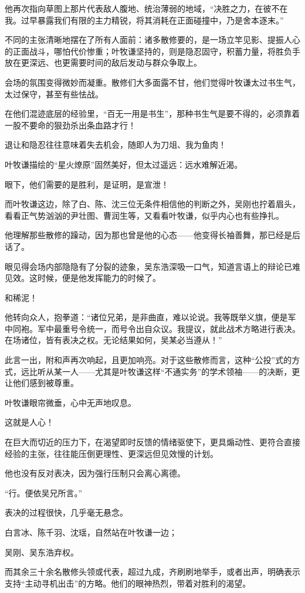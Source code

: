 他再次指向草图上那片代表敌人腹地、统治薄弱的地域，“决胜之力，在彼不在我。过早暴露我们有限的主力精锐，将其消耗在正面碰撞中，乃是舍本逐末。”

不同的主张清晰地摆在了所有人面前：诸多散修要的，是一场立竿见影、提振人心的正面战斗，哪怕代价惨重；叶牧谦坚持的，则是隐忍固守，积蓄力量，将胜负手放在更深远、也更需要时间的敌后发动与群众争取上。

会场的氛围变得微妙而凝重。散修们大多面露不甘，他们觉得叶牧谦太过书生气，太过保守，甚至有些怯战。

在他们混迹底层的经验里，“百无一用是书生”，那种书生气是要不得的，必须靠着一股不要命的狠劲杀出条血路才行！

退让和隐忍往往意味着失去机会，随即人为刀俎、我为鱼肉！

叶牧谦描绘的“星火燎原”固然美好，但太过遥远：远水难解近渴。

眼下，他们需要的是胜利，是证明，是宣泄！

而叶牧谦这边，除了白、陈、沈三位无条件相信他的判断之外，吴刚也拧着眉头，看看正气势汹汹的尹壮图、曹润生等，又看看叶牧谦，似乎内心也有些挣扎。

他理解那些散修的躁动，因为那也曾是他的心态——他变得长袖善舞，那已经是后话了。

眼见得会场内部隐隐有了分裂的迹象，吴东浩深吸一口气，知道言语上的辩论已难见效。这时候，便是他发挥能力的时候了。

和稀泥！

他转向众人，抱拳道：“诸位兄弟，是非曲直，难以论说。我等既举义旗，便是军中同袍。军中最重号令统一，而号令出自众议。我提议，就此战术方略进行表决。在场诸位，皆有表决之权。无论结果如何，吴某必当遵从！”

此言一出，附和声再次响起，且更加响亮。对于这些散修而言，这种“公投”式的方式，远比听从某一人——尤其是叶牧谦这样“不通实务”的学术领袖——的决断，更让他们感到被尊重。

叶牧谦眼帘微垂，心中无声地叹息。

这就是人心！

在巨大而切近的压力下，在渴望即时反馈的情绪驱使下，更具煽动性、更符合直接经验的主张，往往能压倒更理性、更深远但见效慢的计划。

他也没有反对表决，因为强行压制只会离心离德。

“行。便依吴兄所言。”

表决的过程很快，几乎毫无悬念。

白言冰、陈千羽、沈瑶，自然站在叶牧谦一边；

吴刚、吴东浩弃权。

而其余三十余名散修头领或代表，超过九成，齐刷刷地举手，或者出声，明确表示支持“主动寻机出击”的方略。他们的眼神热烈，带着对胜利的渴望。

